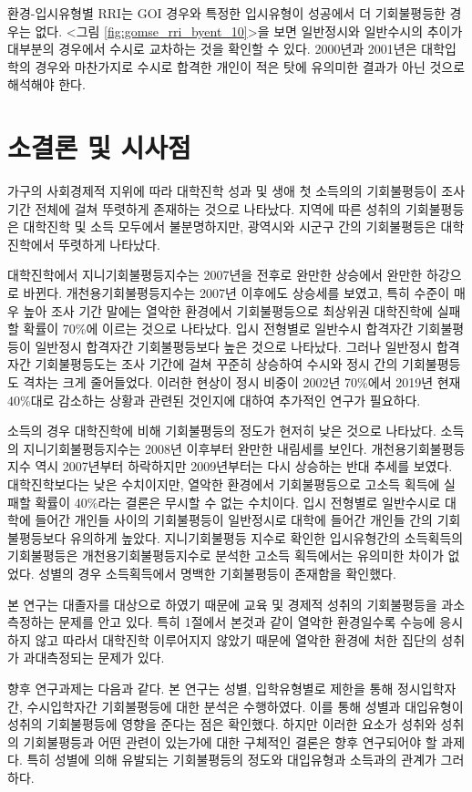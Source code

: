 환경-입시유형별 RRI는 GOI 경우와 특정한 입시유형이 성공에서 더 기회불평등한 경우는 없다.
 <그림 \ref{fig:gomse_rri_byent_10}>을 보면 일반정시와 일반수시의 추이가 대부분의 경우에서 수시로 교차하는 것을 확인할 수 있다.
 2000년과 2001년은 대학입학의 경우와 마찬가지로 수시로 합격한 개인이 적은 탓에 유의미한 결과가 아닌 것으로 해석해야 한다.

\section{소결론 및 시사점}

가구의 사회경제적 지위에 따라 대학진학 성과 및 생애 첫 소득의의 기회불평등이 조사 기간 전체에 걸쳐 뚜렷하게 존재하는 것으로 나타났다.
지역에 따른 성취의 기회불평등은 대학진학 및 소득 모두에서 불분명하지만, 광역시와 시군구 간의 기회불평등은 대학진학에서 뚜렷하게 나타났다.

대학진학에서 지니기회불평등지수는 2007년을 전후로 완만한 상승에서 완만한 하강으로 바뀐다.
 개천용기회불평등지수는 2007년 이후에도 상승세를 보였고, 특히 수준이 매우 높아 조사 기간 말에는 열악한 환경에서 기회불평등으로 최상위권 대학진학에 실패할 확률이 70\%에 이르는 것으로 나타났다.
 입시 전형별로 일반수시 합격자간 기회불평등이 일반정시 합격자간 기회불평등보다 높은 것으로 나타났다.
 그러나 일반정시 합격자간 기회불평등도는 조사 기간에 걸쳐 꾸준히 상승하여 수시와 정시 간의 기회불평등도 격차는 크게 줄어들었다.
 이러한 현상이 정시 비중이 2002년 70\%에서 2019년 현재 40\%대로 감소하는 상황과 관련된 것인지에 대하여 추가적인 연구가 필요하다.

소득의 경우 대학진학에 비해 기회불평등의 정도가 현저히 낮은 것으로 나타났다.
 소득의 지니기회불평등지수는 2008년 이후부터 완만한 내림세를 보인다.
 개천용기회불평등지수 역시 2007년부터 하락하지만 2009년부터는 다시 상승하는 반대 추세를 보였다.
 대학진학보다는 낮은 수치이지만, 열악한 환경에서 기회불평등으로 고소득 획득에 실패할 확률이 40\%라는 결론은 무시할 수 없는 수치이다.
 입시 전형별로 일반수시로 대학에 들어간 개인들 사이의 기회불평등이 일반정시로 대학에 들어간 개인들 간의 기회불평등보다 유의하게 높았다.
 지니기회불평등 지수로 확인한 입시유형간의 소득획득의 기회불평등은 개천용기회불평등지수로 분석한 고소득 획득에서는 유의미한 차이가 없었다.
 성별의 경우 소득획득에서 명백한 기회불평등이 존재함을 확인했다.

본 연구는 대졸자를 대상으로 하였기 때문에 교육 및 경제적 성취의 기회불평등을 과소 측정하는 문제를 안고 있다.
 특히 1절에서 본것과 같이 열악한 환경일수록 수능에 응시하지 않고 따라서 대학진학 이루어지지 않았기 때문에 열악한 환경에 처한 집단의 성취가 과대측정되는 문제가 있다.

향후 연구과제는 다음과 같다.
본 연구는 성별, 입학유형별로 제한을 통해 정시입학자간, 수시입학자간 기회불평등에 대한 분석은 수행하였다.
 이를 통해 성별과 대입유형이 성취의 기회불평등에 영향을 준다는 점은 확인했다.
 하지만 이러한 요소가 성취와 성취의 기회불평등과 어떤 관련이 있는가에 대한 구체적인 결론은 향후 연구되어야 할 과제다.
 특히 성별에 의해 유발되는 기회불평등의 정도와 대입유형과 소득과의 관계가 그러하다.